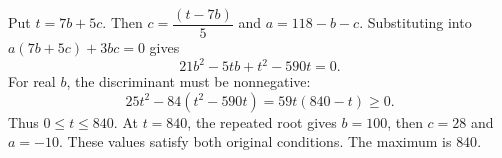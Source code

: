 Put $t=7b+5c$. Then $c=\dfrac{(t-7b)}{5}$ and $a=118-b-c$. Substituting into $a(7b+5c)+3bc=0$ gives
\[
21b^2-5tb+t^2-590t=0.
\]
For real $b$, the discriminant must be nonnegative:
\[
25t^2-84(t^2-590t)=59t(840-t)\ge0.
\]
Thus $0\le t\le840$. At $t=840$, the repeated root gives $b=100$, then $c=28$ and $a=-10$. These values satisfy both original conditions. The maximum is $\boxed{840}$.
